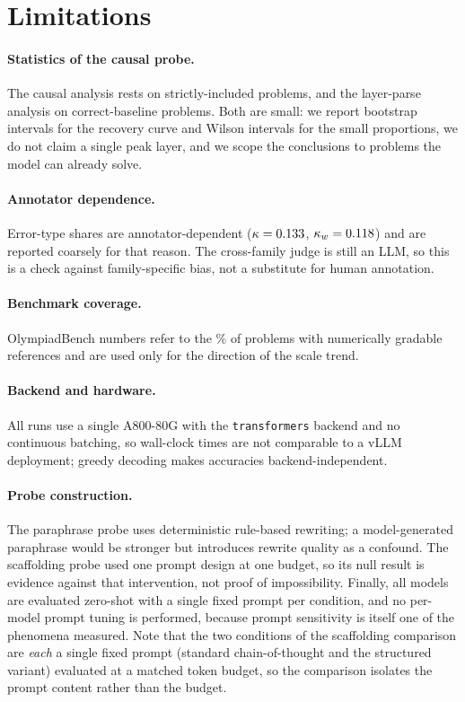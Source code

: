 \documentclass[10pt,letterpaper]{article}
\begin{document}


\section{Limitations}
\label{sec:limitations}
\paragraph{Statistics of the causal probe.}
The causal analysis rests on \nbCausalValid{} strictly-included problems, and the
layer-parse analysis on \nbCleanCorrect{} correct-baseline problems. Both are
small: we report bootstrap intervals for the recovery curve and Wilson intervals
for the small proportions, we do not claim a single peak layer, and we scope the
conclusions to problems the model can already solve.
\paragraph{Annotator dependence.}
Error-type shares are annotator-dependent ($\kappa=0.133$,
$\kappa_w=0.118$) and are reported coarsely for that reason. The
cross-family judge is still an LLM, so this is a check against family-specific
bias, not a substitute for human annotation.
\paragraph{Benchmark coverage.}
OlympiadBench numbers refer to the \pctOlympiadScorable\% of problems with
numerically gradable references and are used only for the direction of the scale
trend.
\paragraph{Backend and hardware.}
All runs use a single A800-80G with the \texttt{transformers} backend and no
continuous batching, so wall-clock times are not comparable to a vLLM deployment;
greedy decoding makes accuracies backend-independent.
\paragraph{Probe construction.}
The paraphrase probe uses deterministic rule-based rewriting; a model-generated
paraphrase would be stronger but introduces rewrite quality as a confound. The
scaffolding probe used one prompt design at one budget, so its null result is
evidence against that intervention, not proof of impossibility. Finally, all models
are evaluated zero-shot with a single fixed prompt per condition, and no per-model
prompt tuning is performed, because prompt sensitivity is itself one of the
phenomena measured. Note that the two conditions of the scaffolding comparison are
\emph{each} a single fixed prompt (standard chain-of-thought and the structured
variant) evaluated at a matched token budget, so the comparison isolates the
prompt content rather than the budget.
\end{document}
